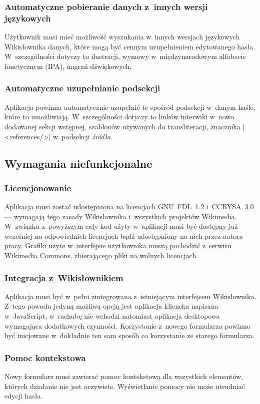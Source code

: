 \subsubsection{Automatyczne pobieranie danych z~innych wersji językowych}
Użytkownik musi mieć możliwość wyszukania w~innych wersjach językowych Wikisłownika danych, które mogą być cennym uzupełnieniem edytowanego hasła. W~szczególności dotyczy to ilustracji, wymowy w~międzynarodowym alfabecie fonetycznym (IPA), nagrań dźwiękowych.%

\subsubsection{Automatyczne uzupełnianie podsekcji}
Aplikacja powinna automatycznie uzupełnić te spośród podsekcji w~danym haśle, które to umożliwiają. W~szczególności dotyczy to linków interwiki w~nowo dodawanej sekcji wstępnej, szablonów używanych do transliteracji, znacznika \kod|<references/>| w~podsekcji \emph{źródła}.%

\subsection{Wymagania niefunkcjonalne}
\subsubsection{Licencjonowanie}
Aplikacja musi zostać udostępniona na licencjach GNU~FDL~1.2 i~CC\dywiz{}BY\dywiz{}SA~3.0 --- wymagają tego zasady Wikisłownika i~wszystkich projektów Wikimedia. W~związku z~powyższym cały kod użyty w~aplikacji musi być dostępny już wcześniej na odpowiednich licencjach bądź udostępniony na nich przez autora pracy. Grafiki użyte w~interfejsie użytkownika muszą pochodzić z~serwisu Wikimedia Commons, zbierającego pliki na wolnych licencjach.

\subsubsection{Integracja z~Wikisłownikiem}
Aplikacja musi być w~pełni zintegrowana z~istniejącym interfejsem Wikisłownika. Z~tego powodu jedyną możliwą opcją jest aplikacja kliencka napisana w~JavaScript, w~rachubę nie wchodzi natomiast aplikacja desktopowa wymagająca dodatkowych czynności. Korzystanie z~nowego formularza powinno być inicjowane w~dokładnie ten sam sposób co korzystanie ze starego formularza.

\subsubsection{Pomoc kontekstowa}
Nowy formularz musi zawierać pomoc kontekstową dla wszystkich elementów, których działanie nie jest oczywiste. Wyświetlanie pomocy nie może utrudniać edycji hasła.

